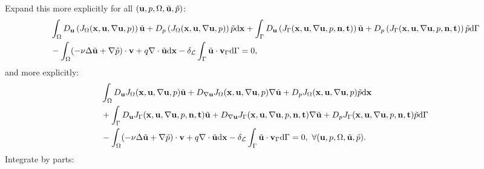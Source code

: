 \documentclass[oneside]{book}
\numberwithin{equation}{section}
\begin{document}
Expand this more explicitly for all $({\bf u},p,\Omega,\tilde{\bf u},\tilde{p})$:
\begin{align*}
    &\int_\Omega D_{\bf u}\left(J_\Omega({\bf x},{\bf u},\nabla{\bf u},p)\right)\tilde{\bf u} + D_p\left(J_\Omega({\bf x},{\bf u},\nabla{\bf u},p)\right)\tilde{p}{\rm d}{\bf x} + \int_\Gamma D_{\bf u}\left(J_\Gamma({\bf x},{\bf u},\nabla{\bf u},p,{\bf n},{\bf t})\right)\tilde{\bf u} + D_p\left(J_\Gamma({\bf x},{\bf u},\nabla{\bf u},p,{\bf n},{\bf t})\right)\tilde{p}{\rm d}\Gamma\\
    &-\int_\Omega (-\nu\Delta\tilde{\bf u} + \nabla\tilde{p})\cdot{\bf v} + q\nabla\cdot\tilde{\bf u}{\rm d}{\bf x} - \delta_{\mathcal{L}}\int_\Gamma \tilde{\bf u}\cdot{\bf v}_\Gamma{\rm d}\Gamma = 0,
\end{align*}
and more explicitly:
\begin{align*}
    &\int_\Omega D_{\bf u}J_\Omega({\bf x},{\bf u},\nabla{\bf u},p)\tilde{\bf u} + D_{\nabla{\bf u}}J_\Omega({\bf x},{\bf u},\nabla{\bf u},p)\nabla\tilde{\bf u} + D_pJ_\Omega({\bf x},{\bf u},\nabla{\bf u},p)\tilde{p}{\rm d}{\bf x}\\
    &+ \int_\Gamma D_{\bf u}J_\Gamma({\bf x},{\bf u},\nabla{\bf u},p,{\bf n},{\bf t})\tilde{\bf u} + D_{\nabla{\bf u}}J_\Gamma({\bf x},{\bf u},\nabla{\bf u},p,{\bf n},{\bf t})\nabla\tilde{\bf u} + D_pJ_\Gamma({\bf x},{\bf u},\nabla{\bf u},p,{\bf n},{\bf t})\tilde{p}{\rm d}\Gamma\\
    &-\int_\Omega (-\nu\Delta\tilde{\bf u} + \nabla\tilde{p})\cdot{\bf v} + q\nabla\cdot\tilde{\bf u}{\rm d}{\bf x} - \delta_{\mathcal{L}}\int_\Gamma \tilde{\bf u}\cdot{\bf v}_\Gamma{\rm d}\Gamma = 0,\ \forall({\bf u},p,\Omega,\tilde{\bf u},\tilde{p}).
\end{align*}
Integrate by parts:
\end{document}
